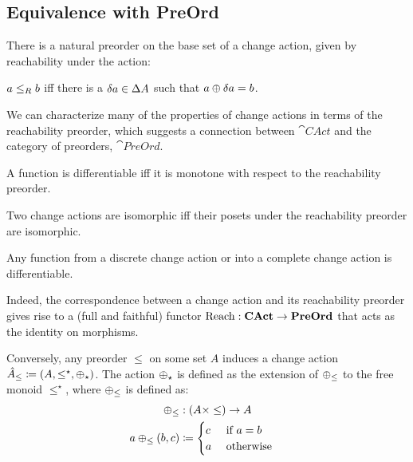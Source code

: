 \subsection{Equivalence with PreOrd}

There is a natural preorder on the base set of a change action, given by reachability
under the action:

\begin{defn}
  $a \leq_R b$ iff there is a $\delta a \in \Delta A$ such that $a \oplus
  \delta a = b$.
\end{defn}

We can characterize many of the properties of change actions in terms of the reachability preorder,
which suggests a connection between $\cat{CAct}$ and the category of preorders, $\cat{PreOrd}$.

\begin{prop}
  A function is differentiable iff it is monotone with respect to the
  reachability preorder. 
\end{prop}

\begin{corollary}
  Two change actions are isomorphic iff their posets under the reachability
  preorder are isomorphic.
\end{corollary}

\begin{corollary}
  Any function from a discrete change action or into a complete change
  action is differentiable.
\end{corollary}

Indeed, the correspondence between a change action and its reachability preorder gives rise to
a (full and faithful) functor $\operatorname{Reach} : \mathbf{CAct} \rightarrow \mathbf{PreOrd}$ that acts as the
identity on morphisms.

Conversely, any preorder $\leq$ on some set $A$ induces a change action
$\hat{A}_\leq \coloneqq (A,\leq^\star,\oplus_\star)$.
The action $\oplus_\star$ is defined as the extension of $\oplus_\leq$ to the free
monoid $\leq^\star$, where $\oplus_\leq$ is defined as:
\[
\begin{aligned}
   \oplus_\leq &: (A \times \leq) \rightarrow A&\\
   a \oplus_\leq (b, c) &\coloneqq
     \begin{cases}
     c&\text{ if $a = b$}\\
     a&\text{ otherwise}
     \end{cases}
\end{aligned}
\]

